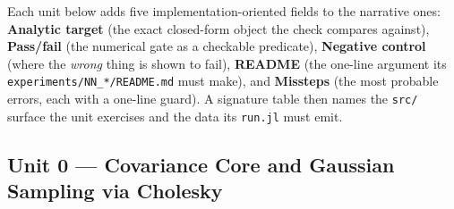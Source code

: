 \documentclass[11pt]{article}
\begin{document}
Each unit below adds five implementation-oriented fields to the narrative ones: \textbf{Analytic target} (the exact closed-form object the check compares against), \textbf{Pass/fail} (the numerical gate as a checkable predicate), \textbf{Negative control} (where the \emph{wrong} thing is shown to fail), \textbf{README} (the one-line argument its \texttt{experiments/NN\_*/README.md} must make), and \textbf{Missteps} (the most probable errors, each with a one-line guard). A signature table then names the \texttt{src/} surface the unit exercises and the data its \texttt{run.jl} must emit.

\subsection*{Unit 0 --- Covariance Core and Gaussian Sampling via Cholesky}
\end{document}
